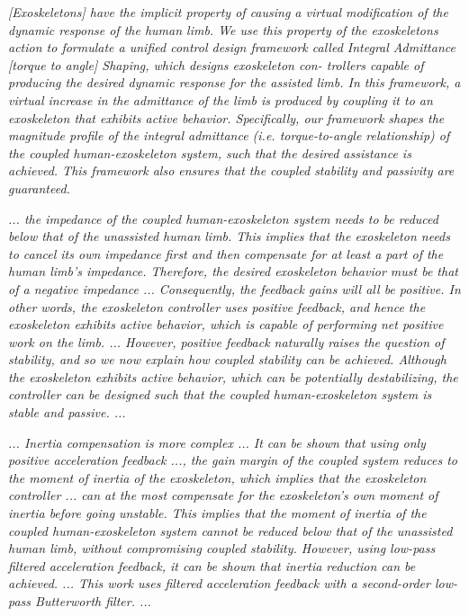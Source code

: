 \documentclass[letterpaper,12pt,fullpage]{article}
\begin{document}
{\it [Exoskeletons] have the implicit property
of causing a virtual modification of the dynamic response of
the human limb. We use this property of the exoskeletons
action to formulate a unified control design framework called
Integral Admittance [torque to angle] Shaping, which designs exoskeleton con-
trollers capable of producing the desired dynamic response
for the assisted limb. In this framework, a virtual increase
in the admittance of the limb is produced by coupling it
to an exoskeleton that exhibits active behavior. Specifically,
our framework shapes the magnitude profile of the integral
admittance (i.e. torque-to-angle relationship) of the coupled
human-exoskeleton system, such that the desired assistance is
achieved. This framework also ensures that the coupled stability
and passivity are guaranteed.}~\cite{Nagarajan_etal_2015}

{\it ... the impedance of the coupled human-exoskeleton
system needs to be reduced below that of the unassisted
human limb. This implies that the exoskeleton needs to
cancel its own impedance first and then compensate for
at least a part of the human limb’s impedance. Therefore,
the desired exoskeleton behavior must be that of a negative
impedance ... Consequently,
the feedback gains will all be
positive. In other words, the exoskeleton controller uses
positive feedback, and hence the exoskeleton exhibits active
behavior, which is capable of performing net positive work
on the limb. ...
However, positive feedback naturally raises the question of
stability, and so we now explain how coupled stability can be
achieved. Although the exoskeleton exhibits active behavior,
which can be potentially destabilizing, the controller can be
designed such that the coupled human-exoskeleton system
is stable and passive. ... 
}~\cite{Nagarajan_etal_2015}

{\it
... Inertia compensation is more complex ...
It can be shown that using only positive acceleration
feedback ..., the gain margin of the coupled system
reduces to the moment of inertia of the exoskeleton, which
implies that the exoskeleton controller ... can at the most
compensate for the exoskeleton’s own moment of inertia
before going unstable. This implies that the moment of
inertia of the coupled human-exoskeleton system cannot be
reduced below that of the unassisted human limb, without
compromising coupled stability. However, using low-pass
filtered acceleration feedback, it can be shown that inertia 
reduction can be achieved. ...
This work uses filtered acceleration
feedback with a second-order low-pass Butterworth filter. ...
}~\cite{Nagarajan_etal_2015}
\end{document}
